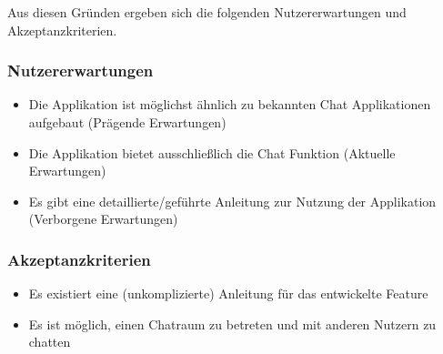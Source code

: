\noindent{}Aus diesen Gründen ergeben sich die folgenden Nutzererwartungen und Akzeptanzkriterien.

\subsubsection{Nutzererwartungen}
\begin{itemize}
  \item Die Applikation ist möglichst ähnlich zu bekannten Chat Applikationen aufgebaut (Prägende Erwartungen)
  \item Die Applikation bietet ausschließlich die Chat Funktion (Aktuelle Erwartungen)
  \item Es gibt eine detaillierte/geführte Anleitung zur Nutzung der Applikation (Verborgene Erwartungen)
\end{itemize}

\subsubsection{Akzeptanzkriterien}
\begin{itemize}
  \item Es existiert eine (unkomplizierte) Anleitung für das entwickelte Feature
  \item Es ist möglich, einen Chatraum zu betreten und mit anderen Nutzern zu chatten
\end{itemize}


